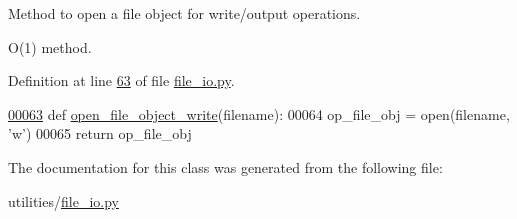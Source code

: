 Method to open a file object for write/output operations. 

O(1) method. 

Definition at line \hyperlink{file__io_8py_source_l00063}{63} of file \hyperlink{file__io_8py_source}{file\+\_\+io.\+py}.


\begin{DoxyCode}
\hypertarget{classutilities_1_1file__io_1_1file__io__operations_l00063}{}\hyperlink{classutilities_1_1file__io_1_1file__io__operations_aaf94e26da1d988ece479d1600ad1de4a}{00063}     \textcolor{keyword}{def }\hyperlink{classutilities_1_1file__io_1_1file__io__operations_aaf94e26da1d988ece479d1600ad1de4a}{open\_file\_object\_write}(filename):
00064         op\_file\_obj = open(filename, \textcolor{stringliteral}{'w'})
00065         \textcolor{keywordflow}{return} op\_file\_obj
\end{DoxyCode}


The documentation for this class was generated from the following file\+:\begin{DoxyCompactItemize}
\item 
utilities/\hyperlink{file__io_8py}{file\+\_\+io.\+py}\end{DoxyCompactItemize}
